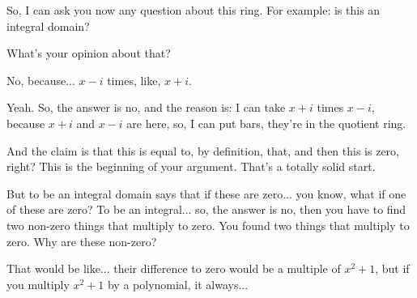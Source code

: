 \begin{speech}[01:16:10 - 01:16:41]
So, I can ask you now any question about this ring. For example: is this an integral domain? 

What's your opinion about that?
\end{speech}

\begin{student}
No, because... $x - i$ times, like, $x + i$.
\end{student}

\begin{speech}[01:16:43 - 01:17:31]
Yeah. So, the answer is no,  and the reason is: I can take $x + i$ times $x - i$, because $x + i$ and $x - i$ are here, so, I can put bars, they're in the quotient ring.  

And the claim is that this is equal to, by definition, that,  and then this is zero,  right? This is the beginning of your argument. That's a totally solid start.

But to be an integral domain says that if these are zero... you know, what if one of these are zero? To be an integral... so, the answer is no, then you have to find two non-zero things that multiply to zero. You found two things that multiply to zero. Why are these non-zero?
\end{speech}

\begin{student}
That would be like... their difference to zero would be a multiple of $x^2 + 1$, but if you multiply $x^2 + 1$ by a polynomial, it always...
\end{student}

